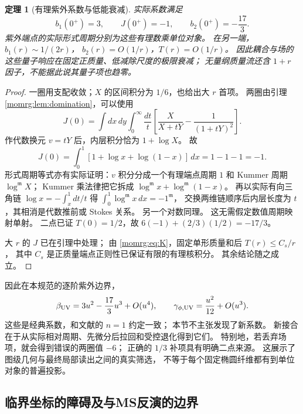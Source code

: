 \documentclass[11pt,a4paper,oneside]{ctexart}
\theoremstyle{cnplain}
\newtheorem{theorem}{定理}[section]
\theoremstyle{definition}
\theoremstyle{remark}
\numberwithin{equation}{section}
\begin{document}
\begin{theorem}[有理紫外系数与低能衰减]\label{momrg:thm:UV}
实际系数满足
\begin{equation}\label{momrg:eq:UV}
 b_1(0^+)=3,\qquad J(0^+)=-1,\qquad
 b_2(0^+)=-\frac{17}{3}.
\end{equation}
紫外端点的实际形式周期分别为这些有理数乘单位对象。
在另一端，$b_1(r)\sim1/(2r)$，
$b_2(r)=O(1/r)$，$T(r)=O(1/r)$。
因此耦合与场的这些量子响应在固定正质量、低减除尺度的极限衰减；
无量纲质量流还含 $1+r$ 因子，不能据此说其量子项也趋零。
\end{theorem}
\begin{proof}
一圈用支配收敛；$X$ 的区间积分为 $1/6$，也给出大 $r$ 首项。
两圈由引理\ref{momrg:lem:domination}，可以使用
\begin{equation}\label{momrg:eq:massless}
 J(0)=\int dx\,dy\int_0^\infty\frac{dt}{t}
       \left[\frac{X}{X+tY}-\frac1{(1+tY)^2}\right].
\end{equation}
作代数换元 $v=tY$ 后，内层积分恰为 $1+\log X$。
故
\[
 J(0)=\int_0^1[1+\log x+\log(1-x)]\,dx=1-1-1=-1.
\]
形式周期等式亦有实际证明：$v$ 积分分成一个有理端点周期 $1$
和 Kummer 周期 $\log^{\mathfrak m}X$；
Kummer 乘法律把它拆成 $\log^{\mathfrak m}x+\log^{\mathfrak m}(1-x)$。
再以实际有向三角链
$\log x=-\int_x^1dt/t$ 得
$\int_0^1\log^{\mathfrak m}x\,dx=-1^{\mathfrak m}$，
交换两维链顺序后内层长度为 $t$，其相消是代数推前或 Stokes 关系。
另一个对数同理。
这无需假定数值周期映射单射。
二点已证 $T(0)=1/2$，故 $6(-1)+(2/3)(1/2)=-17/3$。

大 $r$ 的 $J$ 已在引理中处理；
由 \eqref{momrg:eq:K}，固定单形质量和后
$T(r)\leq C_s/r$，
其中 $C_s$ 是正质量端点正则性已保证有限的有理核积分。
其余结论随之成立。
\end{proof}

因此在本规范的逐阶紫外边界，
\begin{equation}\label{momrg:eq:classical}
 \beta_{\rm UV}=3u^2-\frac{17}{3}u^3+O(u^4),
 \qquad \gamma_{\phi,\rm UV}=\frac{u^2}{12}+O(u^3).
\end{equation}
这些是经典系数，和文献\cite[第II节及式(19)]{kp}的 $n=1$ 约定一致；
本节不主张发现了新系数。
新接合在于从实际相对周期、先微分后拉回和受控退化得到它们。
特别地，若丢弃场项，就会得到错误的两圈值 $-6$；
正确的 $1/3$ 补项具有明确二点来源。
这展示了图级几何与最终局部读出之间的真实筛选，
不等于每个固定椭圆纤维都有到单位对象的普遍投影。


\subsection{临界坐标的障碍及与MS反演的边界}\label{momrg:sec:critical}
\end{document}
